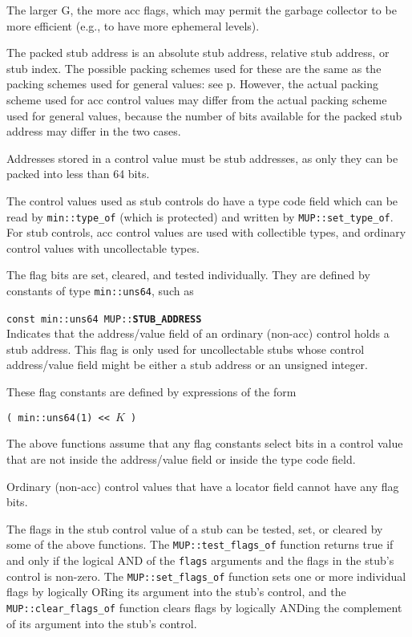 \documentclass[12pt]{article}
\makeatletter
\newcommand{\ttindex}[1]{\index{#1@{\tt #1}}}
\newcommand{\MUPindex}[1]{\ttindex{MUP::#1}\ttindex{#1}}
\newcommand{\pagref}[1]{p\pageref{#1}}
\newenvironment{indpar}[1][0.3in]%
	{\begin{list}{}%
		     {\setlength{\itemsep}{0in}%
		      \setlength{\topsep}{0in}%
		      \setlength{\parsep}{1ex}%
		      \setlength{\labelwidth}{#1}%
		      \setlength{\leftmargin}{#1}%
		      \addtolength{\leftmargin}{\labelsep}}%
	 \item}%
	{\end{list}}
\newcommand{\LABEL}[1]{\label{#1}}
\newcommand{\MUPKEY}[1]{{\tt \bf #1}\MUPindex{#1}}
\makeatother
\begin{document}
The larger G, the more acc flags, which may permit the
garbage collector to be more efficient (e.g., to have more ephemeral
levels).

The packed stub address is an absolute stub address,
relative stub address, or stub index.  The possible packing schemes used for
these are the same as the packing schemes used for general values:
see \pagref{STUB-ADDRESS-PACKING}.  However, the actual packing scheme
used for acc control values may differ from the actual packing scheme
used for general values, because the number of bits available for the
packed stub address may differ in the two cases.

Addresses stored in a control value must be stub addresses, as only they
can be packed into less than 64 bits.

The control values used as stub controls do have a type code field which
can be read by \verb|min::type_of| (which is protected) and
written by \verb|MUP::set_type_of|.  For stub controls,
acc control values are used with
collectible types, and ordinary control values with
uncollectable types.

The flag bits are set, cleared, and tested individually.  They are
defined by constants of type \verb|min::uns64|, such as

\begin{indpar}
\begin{list}{}{}
\item[{\tt const min::uns64 MUP::}\MUPKEY{STUB\_ADDRESS}]~%
	\LABEL{MIN::STUB_ADDRESS}\\
Indicates that the address/value field of an ordinary (non-acc)
control holds a stub address.  This flag is only used for
uncollectable stubs whose control address/value field might
be either a stub address or an unsigned integer.
\end{list}
\end{indpar}

These flag constants are defined by expressions of the form

\begin{center}
\verb|( min::uns64(1) << |$K$\verb| )|
\end{center}

The above functions assume that any flag constants select bits
in a control value that are not inside the address/value field
or inside the type code field.

Ordinary (non-acc) control values that have a locator
field cannot have any flag bits.

The flags in the stub control value of a stub can be tested, set, or
cleared by some of the above functions.
The \verb|MUP::test_flags_of| function
returns true if and only if the logical AND of the \verb|flags| arguments
and the flags in the stub's control is non-zero.  The \verb|MUP::set_flags_of|
function sets one or more individual flags by logically ORing its
argument into the stub's control, and the
\verb|MUP::clear_flags_of| function clears flags by logically ANDing
the complement of its argument into the stub's control.
\end{document}
